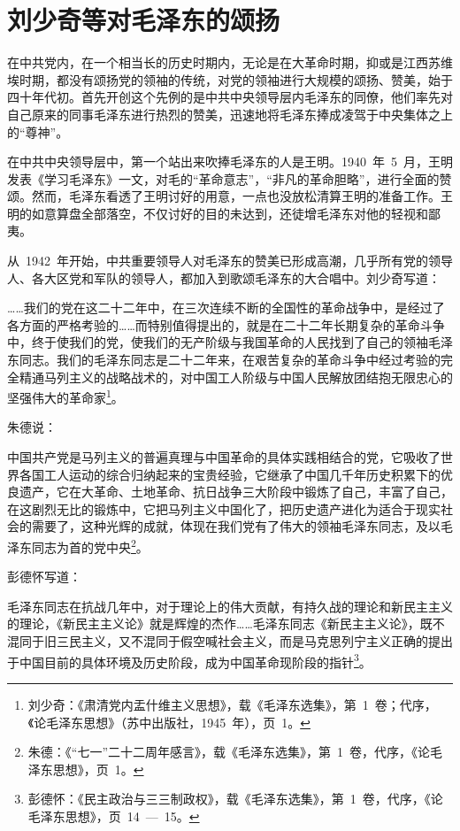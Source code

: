 \section{刘少奇等对毛泽东的颂扬}

在中共党内，在一个相当长的历史时期内，无论是在大革命时期，抑或是江西苏维埃时期，都没有颂扬党的领袖的传统，对党的领袖进行大规模的颂扬、赞美，始于四十年代初。首先开创这个先例的是中共中央领导层内毛泽东的同僚，他们率先对自己原来的同事毛泽东进行热烈的赞美，迅速地将毛泽东捧成凌驾于中央集体之上的“尊神”。

在中共中央领导层中，第一个站出来吹捧毛泽东的人是王明。1940~年~5~月，王明发表《学习毛泽东》一文，对毛的“革命意志”，“非凡的革命胆略”，进行全面的赞颂。然而，毛泽东看透了王明讨好的用意，一点也没放松清算王明的准备工作。王明的如意算盘全部落空，不仅讨好的目的未达到，还徒增毛泽东对他的轻视和鄙夷。

从~1942~年开始，中共重要领导人对毛泽东的赞美已形成高潮，几乎所有党的领导人、各大区党和军队的领导人，都加入到歌颂毛泽东的大合唱中。刘少奇写道：

\begin{quoting}
……我们的党在这二十二年中，在三次连续不断的全国性的革命战争中，是经过了各方面的严格考验的……而特别值得提出的，就是在二十二年长期复杂的革命斗争中，终于使我们的党，使我们的无产阶级与我国革命的人民找到了自己的领袖毛泽东同志。我们的毛泽东同志是二十二年来，在艰苦复杂的革命斗争中经过考验的完全精通马列主义的战略战术的，对中国工人阶级与中国人民解放团结抱无限忠心的坚强伟大的革命家\footnote{刘少奇：《肃清党内盂什维主义思想》，载《毛泽东选集》，第~1~卷；代序，《论毛泽东思想》（苏中出版社，1945~年），页~1。}。
\end{quoting}

朱德说：

\begin{quoting}
中国共产党是马列主义的普遍真理与中国革命的具体实践相结合的党，它吸收了世界各国工人运动的综合归纳起来的宝贵经验，它继承了中国几千年历史积累下的优良遗产，它在大革命、土地革命、抗日战争三大阶段中锻炼了自己，丰富了自己，在这剧烈无比的锻炼中，它把马列主义中国化了，把历史遗产进化为适合于现实社会的需要了，这种光辉的成就，体现在我们党有了伟大的领袖毛泽东同志，及以毛泽东同志为首的党中央\footnote{朱德：《“七一”二十二周年感言》，载《毛泽东选集》，第~1~卷，代序，《论毛泽东思想》，页~1。}。
\end{quoting}

彭德怀写道：

\begin{quoting}
毛泽东同志在抗战几年中，对于理论上的伟大贡献，有持久战的理论和新民主主义的理论，《新民主主义论》就是辉煌的杰作……毛泽东同志《新民主主义论》，既不混同于旧三民主义，又不混同于假空喊社会主义，而是马克思列宁主义正确的提出于中国目前的具体环境及历史阶段，成为中国革命现阶段的指针\footnote{彭德怀：《民主政治与三三制政权》，载《毛泽东选集》，第~1~卷，代序，《论毛泽东思想》，页~14~—~15。}。
\end{quoting}

